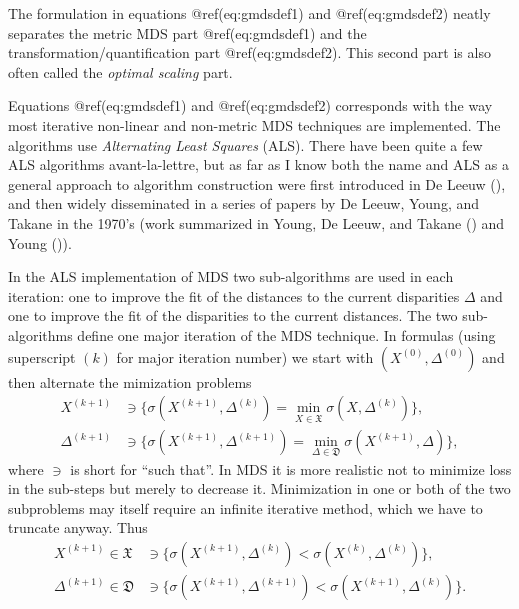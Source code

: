 \documentclass[
  12pt,
  letterpaper,
  DIV=11,
  numbers=noendperiod]{scrartcl}
\begin{document}
The formulation in equations @ref(eq:gmdsdef1) and @ref(eq:gmdsdef2)
neatly separates the metric MDS part @ref(eq:gmdsdef1) and the
transformation/quantification part @ref(eq:gmdsdef2). This second part
is also often called the \emph{optimal scaling} part.

Equations @ref(eq:gmdsdef1) and @ref(eq:gmdsdef2) corresponds with the
way most iterative non-linear and non-metric MDS techniques are
implemented. The algorithms use \emph{Alternating Least Squares} (ALS).
There have been quite a few ALS algorithms avant-la-lettre, but as far
as I know both the name and ALS as a general approach to algorithm
construction were first introduced in De Leeuw
(), and then widely disseminated in a
series of papers by De Leeuw, Young, and Takane in the 1970's (work
summarized in Young, De Leeuw, and Takane
() and Young
()).

In the ALS implementation of MDS two sub-algorithms are used in each
iteration: one to improve the fit of the distances to the current
disparities \(\Delta\) and one to improve the fit of the disparities to
the current distances. The two sub-algorithms define one major iteration
of the MDS technique. In formulas (using superscript \((k)\) for major
iteration number) we start with \((X^{(0)},\Delta^{(0)})\) and then
alternate the mimization problems \begin{subequations}
\begin{align}
X^{(k+1)}&\ni\{\sigma(X^{(k+1)},\Delta^{(k)})=\min_{X\in\mathfrak{X}}\sigma(X,\Delta^{(k)})\},\\
\Delta^{(k+1)}&\ni\{\sigma(X^{(k+1)},\Delta^{(k+1)})=\min_{\Delta\in\mathfrak{D}}\sigma(X^{(k+1)},\Delta)\},
\end{align}
\end{subequations} where \(\ni\) is short for ``such that''. In MDS it
is more realistic not to minimize loss in the sub-steps but merely to
decrease it. Minimization in one or both of the two subproblems may
itself require an infinite iterative method, which we have to truncate
anyway. Thus \begin{subequations}
\begin{align}
X^{(k+1)}\in\mathfrak{X}&\ni\{\sigma(X^{(k+1)},\Delta^{(k)})<\sigma(X^{(k)},\Delta^{(k)})\},\\
\Delta^{(k+1)}\in\mathfrak{D}&\ni\{\sigma(X^{(k+1)},\Delta^{(k+1)})<\sigma(X^{(k+1)},\Delta^{(k)})\}.
\end{align}
\end{subequations}
\end{document}
